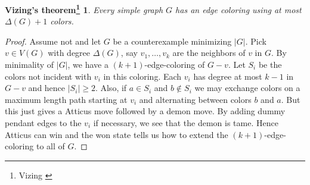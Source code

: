 \documentclass[12pt]{article}
\theoremstyle{plain}
\newtheorem*{vizing}{Vizing's theorem\footnote{Vizing \cite{vizing1965chromatic}}}
\theoremstyle{definition}
\theoremstyle{remark}
\newcommand{\card}[1]{\left|#1\right|}
\begin{document}
\begin{vizing}
Every simple graph $G$ has an edge coloring using at most $\Delta(G) + 1$ colors.
\end{vizing}
\begin{proof}
Assume not and let $G$ be a counterexample minimizing $\card{G}$. Pick $v \in V(G)$ with degree $\Delta(G)$, say $v_1, \ldots, v_k$ are the neighbors of $v$ in $G$. 
By minimality of $\card{G}$, we have a $(k + 1)$-edge-coloring of $G - v$.  
Let $S_i$ be the colors not incident with $v_i$ in this coloring.  
Each $v_i$ has degree at most $k-1$ in $G - v$ and hence $\card{S_i} \geq 2$.  
Also, if $a \in S_i$ and $b \not \in S_i$ we may exchange colors on a maximum length path starting at $v_i$ and alternating between colors $b$ and $a$.  
But this just gives a Atticus move followed by a demon move.  By adding dummy pendant edges to the $v_i$ if necessary, we see that the demon is tame.  
Hence Atticus can win and the won state tells us how to extend the $(k+1)$-edge-coloring to all of $G$.
\end{proof}
\newpage



\end{document}
